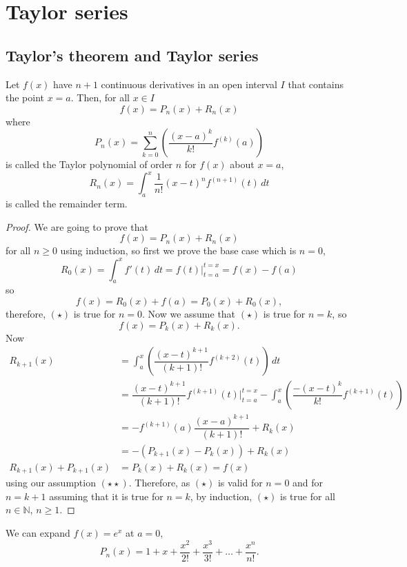 \chapter{Taylor series}

\section{Taylor's theorem and Taylor series}

\begin{theorem}
    Let $f(x)$ have $n+1$ continuous derivatives in an open interval $I$ that contains the point $x=a$. Then, for all $x\in I$ \[f(x)=P_n(x)+R_n(x)\] where \[P_n(x)=\sum_{k=0}^n\left(\dfrac{(x-a)^k}{k!}f^{(k)}(a)\right)\] is called the Taylor polynomial of order $n$ for $f(x)$ about $x=a$, \[R_n(x)=\int_a^x\dfrac1{n!}(x-t)^nf^{(n+1)}(t)\,dt\] is called the remainder term.
\end{theorem}

\begin{proof}
    We are going to prove that \[f(x)=P_n(x)+R_n(x)\tag{$\star$}\] for all $n\geq0$ using induction, so first we prove the base case which is $n=0$, \[R_0(x)=\int^x_af'(t)\,dt=f(t)\Big|^{t=x}_{t=a}=f(x)-f(a)\] so \[f(x)=R_0(x)+f(a)=P_0(x)+R_0(x),\] therefore, $(\star)$ is true for $n=0$. Now we assume that $(\star)$ is true for $n=k$, so \[f(x)=P_k(x)+R_k(x)\tag{$\star\star$}.\] Now 
    \begin{align*}
        R_{k+1}(x)&=\int^x_a\left(\dfrac{(x-t)^{k+1}}{(k+1)!}f^{(k+2)}(t)\right)\,dt\\
        &=\dfrac{(x-t)^{k+1}}{(k+1)!}f^{(k+1)}(t)\Big|^{t=x}_{t=a}-\int^x_a\left(\dfrac{-(x-t)^{k}}{k!}f^{(k+1)}(t)\right)\\
        &=-f^{(k+1)}(a)\dfrac{(x-a)^{k+1}}{(k+1)!}+R_k(x)\\
        &=-(P_{k+1}(x)-P_k(x))+R_k(x)\\
        R_{k+1}(x)+P_{k+1}(x)&=P_k(x)+R_k(x)=f(x)
    \end{align*}
    using our assumption $(\star\star)$. Therefore, as $(\star)$ is valid for $n=0$ and for $n=k+1$ assuming that it is true for $n=k$, by induction, $(\star)$ is true for all $n\in\mathbb N$, $n\geq1$.
\end{proof}

\begin{example}
    We can expand $f(x)=e^x$ at $a=0$, \[P_n(x)=1+x+\dfrac{x^2}{2!}+\dfrac{x^3}{3!}+\ldots+\dfrac{x^n}{n!}.\]
\end{example}

